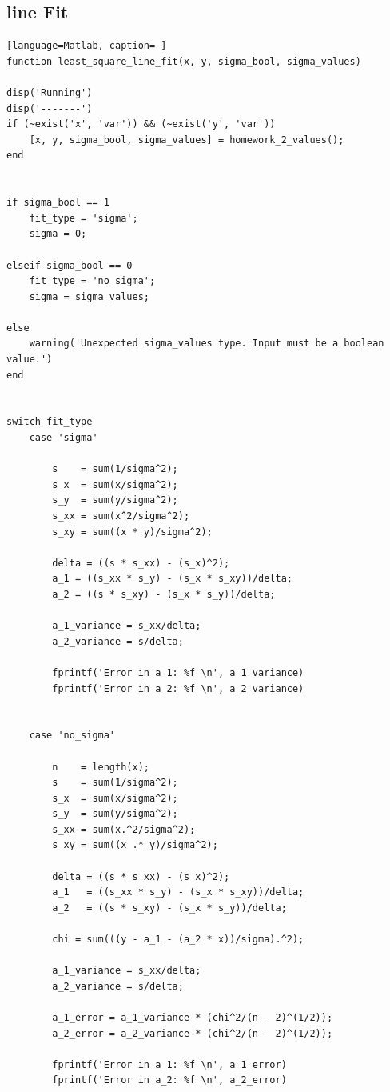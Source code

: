 \documentclass[12pt]{article}
\begin{document}
\subsection*{line Fit}
\begin{lstlisting}[language=Matlab, caption= ]
function least_square_line_fit(x, y, sigma_bool, sigma_values)

disp('Running')
disp('-------')
if (~exist('x', 'var')) && (~exist('y', 'var'))
    [x, y, sigma_bool, sigma_values] = homework_2_values(); 
end


if sigma_bool == 1
    fit_type = 'sigma';
    sigma = 0;
    
elseif sigma_bool == 0
    fit_type = 'no_sigma';
    sigma = sigma_values;

else
    warning('Unexpected sigma_values type. Input must be a boolean value.')
end


switch fit_type
    case 'sigma'
        
        s    = sum(1/sigma^2);
        s_x  = sum(x/sigma^2);
        s_y  = sum(y/sigma^2);
        s_xx = sum(x^2/sigma^2);
        s_xy = sum((x * y)/sigma^2);
        
        delta = ((s * s_xx) - (s_x)^2);
        a_1 = ((s_xx * s_y) - (s_x * s_xy))/delta;
        a_2 = ((s * s_xy) - (s_x * s_y))/delta;
        
        a_1_variance = s_xx/delta;
        a_2_variance = s/delta;
        
        fprintf('Error in a_1: %f \n', a_1_variance)
        fprintf('Error in a_2: %f \n', a_2_variance)
        
        
    case 'no_sigma'
        
        n    = length(x);
        s    = sum(1/sigma^2);
        s_x  = sum(x/sigma^2);
        s_y  = sum(y/sigma^2);
        s_xx = sum(x.^2/sigma^2);
        s_xy = sum((x .* y)/sigma^2);
        
        delta = ((s * s_xx) - (s_x)^2);
        a_1   = ((s_xx * s_y) - (s_x * s_xy))/delta;
        a_2   = ((s * s_xy) - (s_x * s_y))/delta;
        
        chi = sum(((y - a_1 - (a_2 * x))/sigma).^2);
        
        a_1_variance = s_xx/delta;
        a_2_variance = s/delta;
        
        a_1_error = a_1_variance * (chi^2/(n - 2)^(1/2));
        a_2_error = a_2_variance * (chi^2/(n - 2)^(1/2));
        
        fprintf('Error in a_1: %f \n', a_1_error)
        fprintf('Error in a_2: %f \n', a_2_error)
        

\end{lstlisting}
\end{document}
